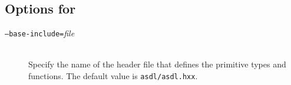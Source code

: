 \subsection*{Options for \Cplusplus}

\begin{description}
  \item[\normalfont\texttt{--base-include=}\textit{file}] \mbox{}\\
    Specify the name of the \Cplusplus{}header file that defines the primitive \asdl{} types
    and functions.
    The default value is \texttt{asdl/asdl.hxx}.
\end{description}%


